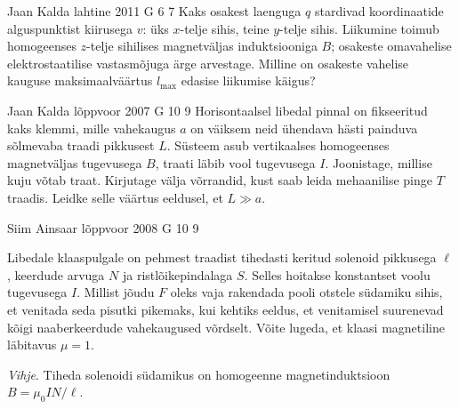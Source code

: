 \documentclass[11pt, twoside]{article}
\begin{document}
{%
{Jaan Kalda} %
{lahtine} %
{2011} %
{G 6} %
{7} %
{
\ifStatement
Kaks osakest laenguga $q$ stardivad koordinaatide alguspunktist kiirusega $v$:
üks $x$-telje sihis, teine $y$-telje sihis.
Liikumine toimub homogeenses $z$-telje sihilises magnetväljas induktsiooniga
$B$; osakeste omavahelise
elektrostaatilise vastasmõjuga ärge arvestage. Milline on osakeste vahelise
kauguse maksimaalväärtus $l_{\max}$ edasise liikumise käigus?
\fi
}

{Jaan Kalda} %
{lõppvoor} %
{2007} %
{G 10} %
{9} %
{
\ifStatement
Horisontaalsel libedal pinnal on fikseeritud kaks klemmi, mille vahekaugus $a$ on väiksem neid ühendava hästi painduva sõlmevaba traadi pikkusest $L$. Süsteem asub vertikaalses homogeenses magnetväljas tugevusega $B$, traati läbib vool tugevusega $I$. Joonistage, millise kuju võtab traat. Kirjutage välja võrrandid, kust saab leida mehaanilise pinge $T$ traadis. Leidke selle väärtus eeldusel, et $L \gg a$.
\fi
}

{Siim Ainsaar} %
{lõppvoor} %
{2008} %
{G 10} %
{9} %
{
\ifStatement
Libedale klaaspulgale on pehmest traadist tihedasti keritud solenoid pikkusega $\ell$, keerdude arvuga $N$ ja ristlõikepindalaga $S$. Selles hoitakse konstantset voolu tugevusega $I$. Millist jõudu $F$ oleks vaja rakendada pooli otstele südamiku sihis, et venitada seda pisutki pikemaks, kui kehtiks eeldus, et venitamisel suurenevad kõigi naaberkeerdude vahekaugused võrdselt. Võite lugeda, et klaasi magnetiline läbitavus $\mu = 1$. 

\emph{Vihje}. Tiheda solenoidi südamikus on homogeenne magnetinduktsioon$ B = \mu_0IN/\ell$.
\fi
}

}
\end{document}
